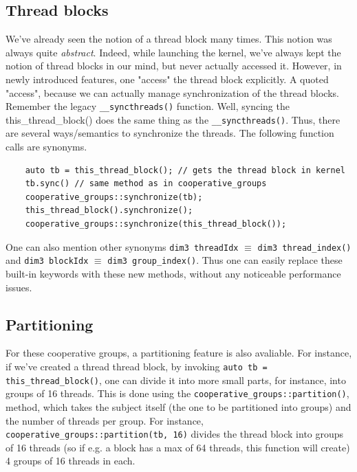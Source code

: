 \subsection*{Thread blocks}
We've already seen the notion of a thread block many times. This notion was always quite \textit{abstract}. Indeed, while launching the kernel, we've 
always kept the notion of thread blocks in our mind, but never actually accessed it. However, in newly introduced features, one "access" the 
thread block explicitly. A quoted "access", because we can actually manage synchronization of the thread blocks. Remember the legacy \verb|__syncthreads()| function. 
Well, syncing the this\_thread\_block() does the same thing as the \verb|__syncthreads()|. Thus, there are several ways/semantics to synchronize the threads. 
The following function calls are synonyms.


\begin{listing}
\begin{verbatim}
    auto tb = this_thread_block(); // gets the thread block in kernel
    tb.sync() // same method as in cooperative_groups
    cooperative_groups::synchronize(tb);
    this_thread_block().synchronize();
    cooperative_groups::synchronize(this_thread_block());
\end{verbatim}
\end{listing}

One can also mention other synonyms \verb|dim3 threadIdx| $\equiv$ \verb|dim3 thread_index()| and \verb|dim3 blockIdx| $\equiv$ \verb|dim3 group_index()|. Thus one can easily replace 
these built-in keywords with these new methods, without any noticeable performance issues.

\subsection*{Partitioning}
For these cooperative groups, a partitioning feature is also avaliable. For instance, if 
we've created a thread thread block, by invoking \verb|auto tb = this_thread_block()|,
one can divide it into more small parts, for instance, into groups of 16 threads. 
This is done using the \verb|cooperative_groups::partition()|, method, which takes the 
subject itself (the one to be partitioned into groups) and the number of threads per group.
For instance, \verb|cooperative_groups::partition(tb, 16)| divides the thread block into 
groups of 16 threads (so if e.g. a block has a max of 64 threads, this function will create)
4 groups of 16 threads in each. 

